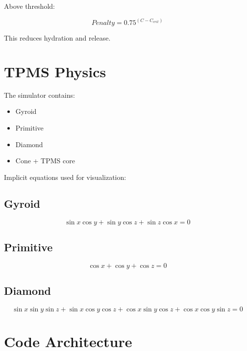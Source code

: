 \documentclass[11pt]{article}
\begin{document}
Above threshold:

\begin{equation}
Penalty = 0.75^{(C-C_{crit})}
\end{equation}

This reduces hydration and release.

\section{TPMS Physics}

The simulator contains:

\begin{itemize}
\item Gyroid
\item Primitive
\item Diamond
\item Cone + TPMS core
\end{itemize}

Implicit equations used for visualization:

\subsection{Gyroid}

\begin{equation}
\sin x\cos y+
\sin y\cos z+
\sin z\cos x=0
\end{equation}

\subsection{Primitive}

\begin{equation}
\cos x+\cos y+\cos z=0
\end{equation}

\subsection{Diamond}

\begin{equation}
\sin x\sin y\sin z
+\sin x\cos y\cos z
+\cos x\sin y\cos z
+\cos x\cos y\sin z=0
\end{equation}

\section{Code Architecture}
\end{document}
